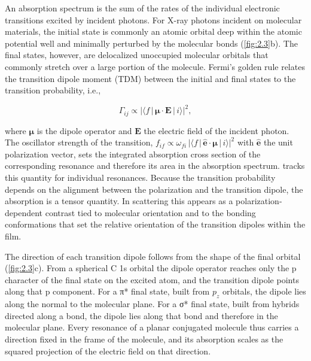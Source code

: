 An absorption spectrum is the sum of the rates of the individual electronic transitions excited by incident photons. For X-ray photons incident on molecular materials, the initial state is commonly an atomic orbital deep within the atomic potential well and minimally perturbed by the molecular bonds (\cref{fig:2.3}b). The final states, however, are delocalized unoccupied molecular orbitals that commonly stretch over a large portion of the molecule. Fermi's golden rule relates the transition dipole moment (TDM) between the initial and final states to the transition probability, i.e.,

\begin{equation}
  \Gamma_{ij} \propto \bigl|\langle f \,|\, \mathbf{\mu} \cdot \mathbf{E} \,|\, i \rangle\bigr|^{2},
  \label{eq:golden-rule}
\end{equation}

where \(\mathbf{\mu}\) is the dipole operator and \(\mathbf{E}\) the electric field of the incident photon. The oscillator strength of the transition, \(f_{if} \propto \omega_{fi}\,|\langle f \,|\, \widehat{\mathbf{e}} \cdot \mathbf{\mu} \,|\, i \rangle|^{2}\) with \(\widehat{\mathbf{e}}\) the unit polarization vector, sets the integrated absorption cross section of the corresponding resonance and therefore its area in the absorption spectrum.\autocite{stohrNEXAFSSpectroscopy1992}  tracks this quantity for individual resonances. Because the transition probability depends on the alignment between the polarization and the transition dipole, the absorption is a tensor quantity. In scattering this appears as a polarization-dependent contrast tied to molecular orientation and to the bonding conformations that set the relative orientation of the transition dipoles within the film.

The direction of each transition dipole follows from the shape of the final orbital (\cref{fig:2.3}c). From a spherical C 1s orbital the dipole operator reaches only the p character of the final state on the excited atom, and the transition dipole points along that p component. For a π* final state, built from \(p_{z}\) orbitals, the dipole lies along the normal to the molecular plane. For a σ* final state, built from hybrids directed along a bond, the dipole lies along that bond and therefore in the molecular plane. Every resonance of a planar conjugated molecule thus carries a direction fixed in the frame of the molecule, and its absorption scales as the squared projection of the electric field on that direction.


